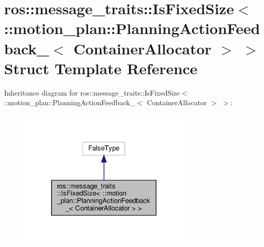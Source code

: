 \hypertarget{structros_1_1message__traits_1_1IsFixedSize_3_01_1_1motion__plan_1_1PlanningActionFeedback___3_01ContainerAllocator_01_4_01_4}{}\section{ros\+:\+:message\+\_\+traits\+:\+:Is\+Fixed\+Size$<$ \+:\+:motion\+\_\+plan\+:\+:Planning\+Action\+Feedback\+\_\+$<$ Container\+Allocator $>$ $>$ Struct Template Reference}
\label{structros_1_1message__traits_1_1IsFixedSize_3_01_1_1motion__plan_1_1PlanningActionFeedback___3_01ContainerAllocator_01_4_01_4}


Inheritance diagram for ros\+:\+:message\+\_\+traits\+:\+:Is\+Fixed\+Size$<$ \+:\+:motion\+\_\+plan\+:\+:Planning\+Action\+Feedback\+\_\+$<$ Container\+Allocator $>$ $>$\+:
\nopagebreak
\begin{figure}[H]
\begin{center}
\leavevmode
\includegraphics[width=234pt]{structros_1_1message__traits_1_1IsFixedSize_3_01_1_1motion__plan_1_1PlanningActionFeedback___3_07b40987b3c5f522587635c69d482122b}
\end{center}
\end{figure}


